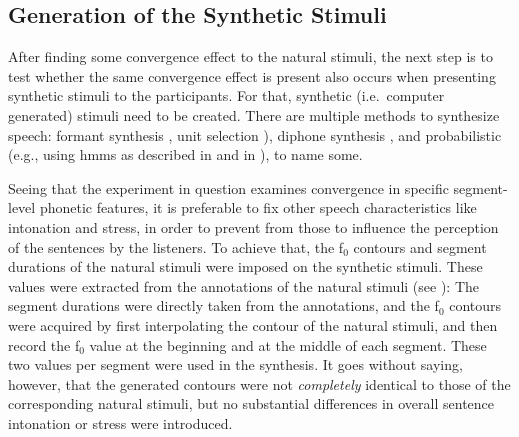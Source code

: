 \subsection{Generation of the Synthetic Stimuli}
\label{Generation_of_the_Synthetic_Stimuli}

After finding some convergence effect to the natural stimuli, the next step is to test whether the same convergence effect is present also occurs when presenting synthetic stimuli to the participants.
For that, synthetic (i.e.\ computer generated) stimuli need to be created.
There are multiple methods to synthesize speech:
formant synthesis \citep[e.g.][]{Burkhardt2000verification}, unit selection \citep{Hunt1996unit,Black2003unit}), diphone synthesis \citep{Dutoit1996mbrola}, and probabilistic (e.g., using \acp{hmm} as described in \citet{Zen2005overview} and in \citet{Zen2009statistical}), to name some.

Seeing that the experiment in question examines convergence in specific segment-level phonetic features, it is preferable to fix other speech characteristics like intonation and stress, in order to prevent from those to influence the perception of the sentences by the listeners.
To achieve that, the f$_0$ contours and segment durations of the natural stimuli were imposed on the synthetic stimuli.
These values were extracted from the annotations of the natural stimuli (see \citet{Gessinger2016PundP}):
The segment durations were directly taken from the annotations, and the f$_0$ contours were acquired by first interpolating the contour of the natural stimuli, and then record the f$_0$ value at the beginning and at the middle of each segment.
These two values per segment were used in the synthesis.
It goes without saying, however, that the generated contours were not \emph{completely} identical to those of the corresponding natural stimuli, but no substantial differences in overall sentence intonation or stress were introduced.
